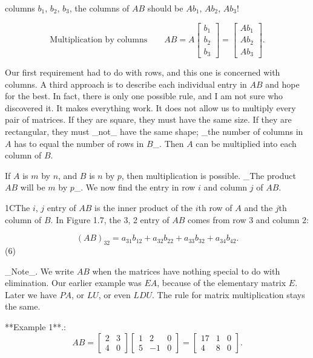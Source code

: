 columns \(b_{1}\), \(b_{2}\), \(b_{3}\), the columns of \(AB\) should be \(Ab_{1}\), \(Ab_{2}\), \(Ab_{3}\)!

\[\text{{Multiplication by columns}}\qquad AB=A\begin{bmatrix}b_{1}\\ b_{2}\\ b_{3}\end{bmatrix}=\begin{bmatrix}Ab_{1}\\ Ab_{2}\\ Ab_{3}\end{bmatrix}.\]

Our first requirement had to do with rows, and this one is concerned with columns. A third approach is to describe each individual entry in \(AB\) and hope for the best. In fact, there is only one possible rule, and I am not sure who discovered it. It makes everything work. It does not allow us to multiply every pair of matrices. If they are square, they must have the same size. If they are rectangular, they must _not_ have the same shape; _the number of columns in \(A\) has to equal the number of rows in \(B\)_. Then \(A\) can be multiplied into each column of \(B\).

If \(A\) is \(m\) by \(n\), and \(B\) is \(n\) by \(p\), then multiplication is possible. _The product \(AB\) will be \(m\) by \(p\)_. We now find the entry in row \(i\) and column \(j\) of \(AB\).

1CThe \(i\), \(j\) entry of \(AB\) is the inner product of the \(i\)th row of \(A\) and the \(j\)th column of \(B\). In Figure 1.7, the 3, 2 entry of \(AB\) comes from row 3 and column 2:

\[(AB)_{32}=a_{31}b_{12}+a_{32}b_{22}+a_{33}b_{32}+a_{34}b_{42}.\] (6)

_Note_. We write \(AB\) when the matrices have nothing special to do with elimination. Our earlier example was \(EA\), because of the elementary matrix \(E\). Later we have \(PA\), or \(LU\), or even \(LDU\). The rule for matrix multiplication stays the same.

**Example 1**.: \[AB=\begin{bmatrix}2&3\\ 4&0\end{bmatrix}\begin{bmatrix}1&2&0\\ 5&-1&0\end{bmatrix}=\begin{bmatrix}17&1&0\\ 4&8&0\end{bmatrix}.\]

